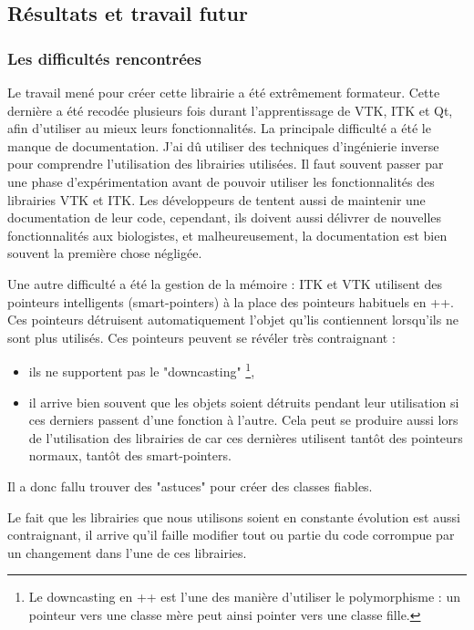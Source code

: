 \subsection{Résultats et travail futur}

\subsubsection*{Les difficultés rencontrées}

Le travail mené pour créer cette librairie a été extrêmement formateur.
Cette dernière a été recodée plusieurs fois durant l'apprentissage de VTK, ITK et Qt, afin d'utiliser au mieux leurs fonctionnalités.
La principale difficulté a été le manque de documentation. J'ai dû utiliser des techniques d'ingénierie inverse pour comprendre l'utilisation des librairies utilisées.
Il faut souvent passer par une phase d'expérimentation avant de pouvoir utiliser les fonctionnalités des librairies VTK et ITK.
Les développeurs de {\gofigure} tentent aussi de maintenir une documentation de leur code, cependant, ils doivent aussi délivrer de nouvelles fonctionnalités aux biologistes, et malheureusement, la documentation est bien souvent la première chose négligée.

Une autre difficulté a été la gestion de la mémoire : ITK et VTK utilisent des pointeurs intelligents (smart-pointers) à la place des pointeurs habituels en {\C++}. Ces pointeurs détruisent automatiquement l'objet qu'lis contiennent lorsqu'ils ne sont plus utilisés. Ces pointeurs peuvent se révéler très contraignant :
\begin{itemize}
  \item ils ne supportent pas le "downcasting"
  \footnote{Le downcasting en \C++ est l'une des manière d'utiliser le polymorphisme : 
  un pointeur vers une classe mère peut ainsi pointer vers une classe fille.},
  \item il arrive bien souvent que les objets soient détruits pendant leur utilisation si ces derniers passent d'une fonction à l'autre.
  Cela peut se produire aussi lors de l'utilisation des librairies de {\gofigure} car ces dernières utilisent tantôt des pointeurs normaux, tantôt des smart-pointers.
\end{itemize}
Il a donc fallu trouver des "astuces" pour créer des classes fiables.

Le fait que les librairies que nous utilisons soient en constante évolution est aussi contraignant,
il arrive qu'il faille modifier tout ou partie du code corrompue par un changement dans l'une de ces librairies.

